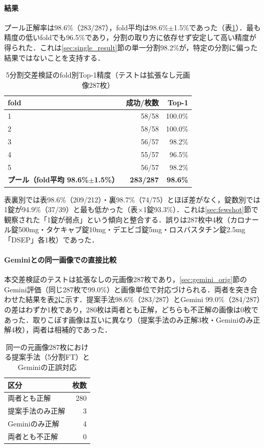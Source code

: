 \documentclass[dvipdfmx]{jsarticle}
\begin{document}
\paragraph{結果}
プール正解率は98.6\%（283/287），fold平均は98.6\%$\pm$1.5\%であった（表\ref{tab:cv}）．最も精度の低いfoldでも96.5\%であり，分割の取り方に依存せず安定して高い精度が得られた．これは\ref{sec:single_result}節の単一分割98.2\%が，特定の分割に偏った結果ではないことを支持する．

\begin{table}[htbp]
\centering
\caption{5分割交差検証のfold別Top-1精度（テストは拡張なし元画像287枚）}
\label{tab:cv}
\begin{tabular}{lrr}
\hline
fold & 成功/枚数 & Top-1 \\
\hline
1 & 58/58 & 100.0\% \\
2 & 58/58 & 100.0\% \\
3 & 56/57 & 98.2\% \\
4 & 55/57 & 96.5\% \\
5 & 56/57 & 98.2\% \\
\hline
\textbf{プール（fold平均 98.6\%$\pm$1.5\%）} & \textbf{283/287} & \textbf{98.6\%} \\
\hline
\end{tabular}
\end{table}

表裏別では表98.6\%（209/212）・裏98.7\%（74/75）とほぼ差がなく，錠数別では1錠が94.9\%（37/39）と最も低かった（表$\times$1錠93.3\%）．これは\ref{sec:fewshot}節で観察された「1錠が弱点」という傾向と整合する．誤りは287枚中4枚（カロナール錠500mg・タケキャブ錠10mg・デエビゴ錠5mg・ロスバスタチン錠2.5mg「DSEP」各1枚）であった．

\paragraph{Geminiとの同一画像での直接比較}
本交差検証のテストは拡張なしの元画像287枚であり，\ref{sec:gemini_orig}節のGemini評価（同じ287枚で99.0\%）と画像単位で対応づけられる．両者を突き合わせた結果を表\ref{tab:cv_gemini}に示す．提案手法98.6\%（283/287）とGemini 99.0\%（284/287）の差はわずか1枚であり，280枚は両者とも正解，どちらも不正解の画像は0枚であった．取りこぼす画像は互いに異なり（提案手法のみ正解3枚・Geminiのみ正解4枚），両者は相補的であった．

\begin{table}[htbp]
\centering
\caption{同一の元画像287枚における提案手法（5分割FT）とGeminiの正誤対応}
\label{tab:cv_gemini}
\begin{tabular}{lr}
\hline
区分 & 枚数 \\
\hline
両者とも正解 & 280 \\
提案手法のみ正解 & 3 \\
Geminiのみ正解 & 4 \\
両者とも不正解 & 0 \\
\hline
\end{tabular}
\end{table}
\end{document}
